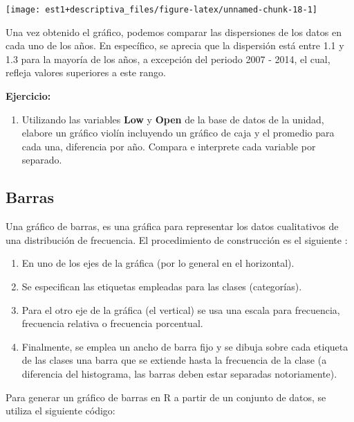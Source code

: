 \documentclass[
]{book}
\providecommand{\tightlist}{%
  \setlength{\itemsep}{0pt}\setlength{\parskip}{0pt}}
\begin{document}
\begin{center}\texttt{[image: est1+descriptiva\_files/figure-latex/unnamed-chunk-18-1]} \end{center}

Una vez obtenido el gráfico, podemos comparar las dispersiones de los datos en cada uno de los años. En específico, se aprecia que la dispersión está entre 1.1 y 1.3 para la mayoría de los años, a excepción del periodo 2007 - 2014, el cual, refleja valores superiores a este rango.

\textbf{Ejercicio:}

\begin{enumerate}
\def\labelenumi{\arabic{enumi}.}
\tightlist
\item
  Utilizando las variables \textbf{Low} y \textbf{Open} de la base de datos de la unidad, elabore un gráfico violín incluyendo un gráfico de caja y el promedio para cada una, diferencia por año. Compara e interprete cada variable por separado.
\end{enumerate}

\hypertarget{barras}{%
\subsection{Barras}\label{barras}}

Una gráfico de barras, es una gráfica para representar los datos cualitativos de una distribución de frecuencia. El procedimiento de construcción es el siguiente \citep[página 29]{anderson}:

\begin{enumerate}
\def\labelenumi{\arabic{enumi}.}
\tightlist
\item
  En uno de los ejes de la gráfica (por lo general en el horizontal).
\item
  Se especifican las etiquetas empleadas para las clases (categorías).
\item
  Para el otro eje de la gráfica (el vertical) se usa una escala para frecuencia, frecuencia relativa o frecuencia porcentual.
\item
  Finalmente, se emplea un ancho de barra fijo y se dibuja sobre cada etiqueta de las clases una barra que se extiende hasta la frecuencia de la clase (a diferencia del histograma, las barras deben estar separadas notoriamente).
\end{enumerate}

Para generar un gráfico de barras en R a partir de un conjunto de datos, se utiliza el siguiente código:
\end{document}
